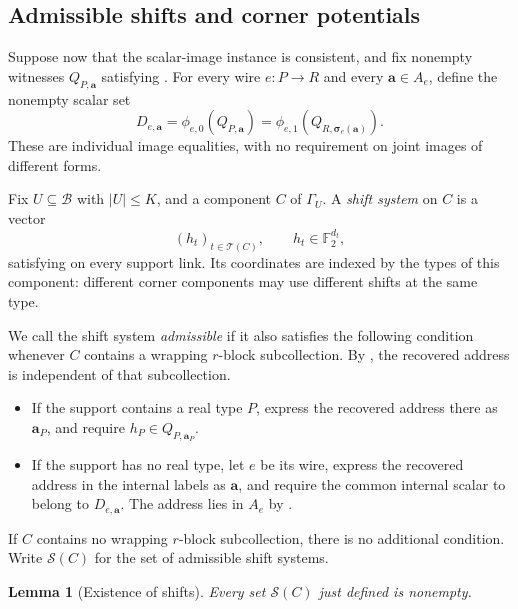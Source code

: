 \documentclass[11pt]{article}
\newtheorem{lemma}[theorem]{Lemma}
\theoremstyle{definition}
\begin{document}
\subsection{Admissible shifts and corner potentials}
\label{offset:shifts}

Suppose now that the scalar-image instance is consistent, and fix
nonempty witnesses \(Q_{P,\mathbf a}\) satisfying
. For every wire \(e:P\to R\) and every
\(\mathbf a\in A_e\), define the nonempty scalar set
\begin{equation}
 D_{e,\mathbf a}
   =\phi_{e,0}(Q_{P,\mathbf a})
   =\phi_{e,1}
       (Q_{R,\boldsymbol\sigma_e(\mathbf a)}).
 \label{offset:eq-wire-images}
\end{equation}
These are individual image equalities, with no requirement on joint
images of different forms.

Fix \(U\subseteq\mathcal B\) with \(\left\lvert{U}\right\rvert\le K\), and a component \(C\) of
\(\Gamma_U\). A \emph{shift system} on \(C\) is a vector
\[
 (h_t)_{t\in\mathcal T(C)},\qquad h_t\in\mathbb F_2^{d_t},
\]
satisfying  on every support link. Its coordinates
are indexed by the types of this component: different corner components
may use different shifts at the same type.

We call the shift system \emph{admissible} if it also satisfies the
following condition whenever \(C\) contains a wrapping \(r\)-block
subcollection. By , the recovered address is
independent of that subcollection.
\begin{itemize}
 \item If the support contains a real type \(P\), express the recovered
 address there as \(\mathbf a_P\), and require
 \(h_P\in Q_{P,\mathbf a_P}\).
 \item If the support has no real type, let \(e\) be its wire, express the
 recovered address in the internal labels as \(\mathbf a\), and require
 the common internal scalar to belong to \(D_{e,\mathbf a}\).
 The address lies in \(A_e\) by .
\end{itemize}
If \(C\) contains no wrapping \(r\)-block subcollection, there is no
additional condition. Write \(\mathcal S(C)\) for the set of admissible
shift systems.

\begin{lemma}[Existence of shifts]
\label{offset:lem-shifts-exist}
Every set \(\mathcal S(C)\) just defined is nonempty.
\end{lemma}
\end{document}
